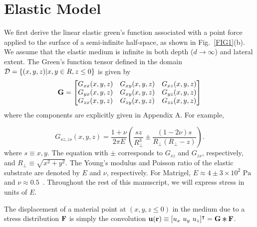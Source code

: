 \documentclass[aps,prl,reprint,twocolumn,groupedaddress,showpacs]{revtex4}
\def\r{{\bf r}}
\def\u{{\bf u}}
\def\F{{\bf F}}
\def\F{{\bf F}}
\newcommand{\Conv}{\mathop{\scalebox{1.5}{\raisebox{-0.2ex}{$\ast$}}}}%
\begin{document}
\section{Elastic Model}

We first derive the linear elastic green's function associated with a
point force applied to the surface of a semi-infinite half-space, as
shown in Fig.~\ref{FIG1}(b). We assume that the elastic medium is
infinite in both depth ($d\to \infty$) and lateral extent. The Green's
function tensor defined in the domain ${\cal D}=\left\{(x,y,z)|x,y\in
R,z\leq0\right\}$ is given by
\begin{equation}
{\bf G} = \left[ \begin{matrix} G_{xx}(x,y,z) & G_{xy}(x,y,z) & G_{xz}(x,y,z) \\
	G_{yx}(x,y,z) & G_{xy}(x,y,z) & G_{yz}(x,y,z) \\
	G_{zx}(x,y,z) & G_{zy}(x,y,z) & G_{zz}(x,y,z) 
 \end{matrix} \right]
\end{equation}
where the components are explicitly given in 
Appendix A. For example, 

\begin{equation}
G_{sz, zs}(x,y,z) =
\frac{1+\nu}{2\pi E}\left(\frac{sz}{R_{\perp}^{3}}\pm\frac{(1-2\nu)s}{R_{\perp}
(R_{\perp}-z)}\right).
\end{equation}
%
where $s\equiv x,y$. The equation with $\pm$ corresponds to $G_{sz}$
and $G_{zs}$, respectively, and $R_{\perp} \equiv \sqrt{x^{2}
  +y^{2}}$. The Young's modulus and Poisson ratio of the elastic
substrate are denoted by $E$ and $\nu$, respectively.  
For Matrigel, $E\approx4\pm3\times10^2\textrm{ Pa}$ and
$\nu\approx0.5$~\cite{SOOFIA2009}. Throughout the rest of 
this manuscript, we will express stress in units of $E$. 

The displacement of a material point at $(x,y,z\leq 0)$ in the medium
due to a stress distribution ${\bf F}$ is simply the convolution
$\u(\r) \equiv [u_x \ u_y\ u_z]^\intercal = {\bf G}\Conv\F$.
%
\end{document}
